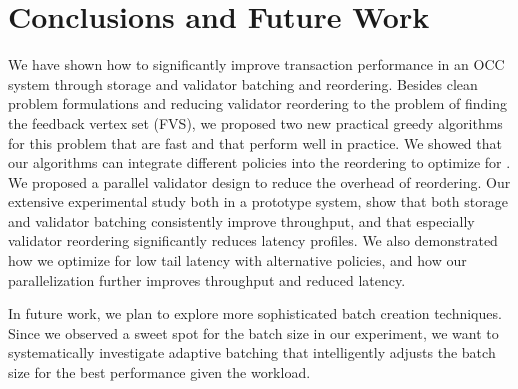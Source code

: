 \section{Conclusions and Future Work}\label{sec:conclusion}

We have shown how to significantly improve transaction performance in an OCC system through storage and validator batching and reordering. Besides clean problem formulations and
reducing validator reordering to the problem of finding the  feedback vertex set (FVS), we proposed two new practical greedy algorithms for this problem
that are fast and that perform well in practice. We showed that our algorithms can integrate different policies into the reordering to optimize for . We  proposed a parallel validator design to reduce the overhead of reordering. Our extensive experimental study both in a prototype system,  show that both storage and validator batching consistently improve throughput, and that especially validator reordering 
significantly reduces latency profiles. We also demonstrated how we optimize for low tail latency with alternative policies, and how our parallelization further improves
throughput and reduced latency.

In future work, we plan to explore more sophisticated batch creation techniques. Since we observed a sweet spot for the  batch size in our experiment, we want to systematically investigate adaptive batching that intelligently adjusts the batch size for the best performance given the workload. 
